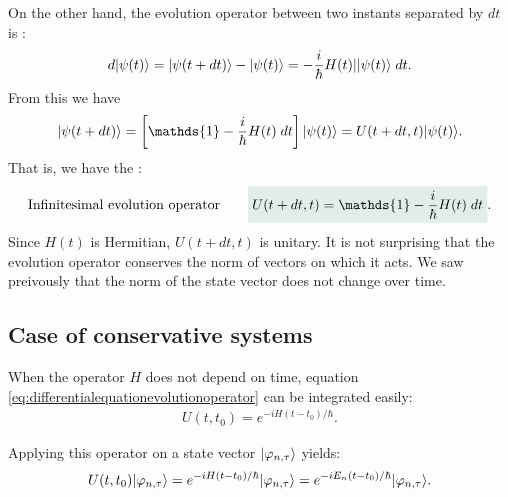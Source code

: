On the other hand, the evolution operator between two instants separated by $dt$ is :
\begin{align*}
    d|\psi(t)\rangle=|\psi(t+dt)\rangle-|\psi(t)\rangle=-\frac{i}{\hbar}H(t)||\psi(t)\rangle\;dt.
\end{align*}
From this we have 
\begin{align*}
    \ket{\psi(t+dt)}=\left[\mathds{1}-\frac{i}{\hbar}H(t)\;dt\right]\ket{\psi(t)}=U(t+dt,t)\ket{\psi(t)}.
\end{align*}
That is, we have the :
\begin{align}
    \text{Infinitesimal evolution operator}\qquad \highlight{U(t+dt,t)=\mathds{1}-\frac{i}{\hbar}H(t)\;dt}.
    \label{eq:infinitesimalevolutionoperator}
\end{align}
Since $H(t)$ is Hermitian, $U(t+dt,t)$ is unitary. It is not surprising that the evolution operator conserves the norm of 
vectors on which it acts. We saw preivously that the norm of the state vector does not change over time.

\subsection{Case of conservative systems}
When the operator $H$ does not depend on time, equation \eqref{eq:differentialequationevolutionoperator} can be integrated easily:
\begin{align}
    U(t,t_0)=e^{-iH(t-t_0)/\hbar}.
\end{align}

Applying this operator on a state vector $|\varphi_{n,\tau}\rangle$ yields:
\begin{align}
    U(t,t_0)|\varphi_{n,\tau}\rangle=e^{-iH(t-t_0)/\hbar}|\varphi_{n,\tau}\rangle=e^{-iE_n(t-t_0)/\hbar}|\varphi_{n,\tau}\rangle.
\end{align}




